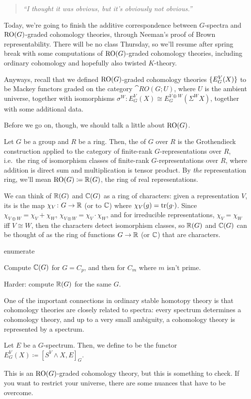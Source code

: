 \begin{quote}\textit{
	``I thought it was obvious, but it's obviously not obvious.''
}\end{quote}
Today, we're going to finish the additive correspondence between $G$-spectra and $\mathrm{RO}(G)$-graded cohomology
theories, through Neeman's proof of Brown representability. There will be no class Thursday, so we'll resume after
spring break with some computations of $\mathrm{RO}(G)$-graded cohomology theories, including ordinary cohomology and
hopefully also twisted $K$-theory.

Anyways, recall that we defined $\mathrm{RO}(G)$-graded cohomology theories $\{E_G^V(X)\}$ to be Mackey functors graded
on the category $\cat{RO}(G;U)$, where $U$ is the ambient universe, together with isomorphisms $\sigma^W\colon
E_G^V(X)\cong E_G^{V\oplus W}(\Sigma^W X)$, together with some additional data.

Before we go on, though, we should talk a little about $\mathrm{RO}(G)$.
\begin{defn}
Let $G$ be a group and $R$ be a ring. Then, the  of $G$ over $R$ is the Grothendieck
construction applied to the category of finite-rank $G$-representations over $R$, i.e.\ the ring of isomorphism
classes of finite-rank $G$-representations over $R$, where addition is direct sum and multiplication is tensor
product. By \emph{the} representation ring, we'll mean $\mathrm{RO}(G)\coloneqq\mathbb R(G)$, the ring of real representations.
\end{defn}
We can think of $\mathbb R(G)$ and $\mathbb C(G)$ as a ring of characters: given a representation $V$, its  is
the map $\chi_V\colon G\to\mathbb R$ (or to $\mathbb C$) where $\chi_V(g) = \operatorname{tr}(g\cdot)$. Since $\chi_{V\oplus W} = \chi_V +
\chi_W$, $\chi_{V\otimes W} = \chi_V\cdot\chi_W$, and for irreducible representations, $\chi_V = \chi_W$ iff
$V\cong W$, then the characters detect isomorphism classes, so $\mathbb R(G)$ and $\mathbb C(G)$ can be thought of as the ring of
functions $G\to\mathbb R$ (or $\mathbb C$) that are characters.
\begin{comp}{ex}{enumerate}
	\item Compute $\mathbb C(G)$ for $G = C_p$, and then for $C_m$ where $m$ isn't prime.
	\item Harder: compute $\mathbb R(G)$ for the same $G$.
\end{comp}
One of the important connections in ordinary stable homotopy theory is that cohomology theories are closely related
to spectra: every spectrum determines a cohomology theory, and up to a very small ambiguity, a cohomology theory is
represented by a spectrum.
\begin{defn}
Let $E$ be a $G$-spectrum. Then, we define  to be the functor $E_G^V(X)\coloneqq [S^V\wedge X,
E]_G$.
\end{defn}
This is an $\mathrm{RO}(G)$-graded cohomology theory, but this is something to check. If you want to restrict your
universe, there are some nuances that have to be overcome.

